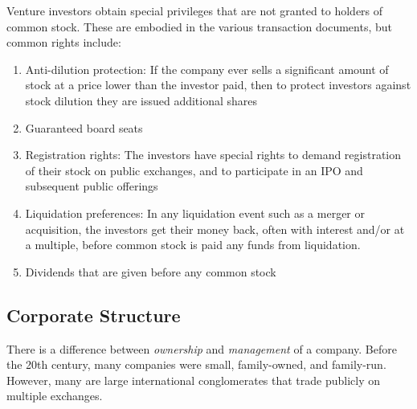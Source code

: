 \documentclass{article}
\begin{document}
    \begin{definition}
      Venture investors obtain special privileges that are not granted to holders of common stock. These are embodied in the various transaction documents, but common rights include: 
      \begin{enumerate}
        \item Anti-dilution protection: If the company ever sells a significant amount of stock at a price lower than the investor paid, then to protect investors against stock dilution they are issued additional shares
        \item Guaranteed board seats
        \item Registration rights: The investors have special rights to demand registration of their stock on public exchanges, and to participate in an IPO and subsequent public offerings
        \item Liquidation preferences: In any liquidation event such as a merger or acquisition, the investors get their money back, often with interest and/or at a multiple, before common stock is paid any funds from liquidation.
        \item Dividends that are given before any common stock
      \end{enumerate}
    \end{definition}

  \subsection{Corporate Structure}

    There is a difference between \textit{ownership} and \textit{management} of a company. Before the 20th century, many companies were small, family-owned, and family-run. However, many are large international conglomerates that trade publicly on multiple exchanges. 
\end{document}
